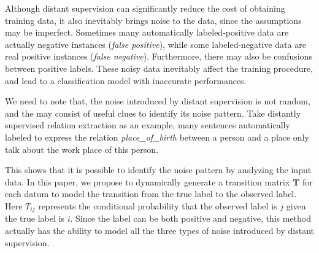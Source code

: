 
Although distant supervision can significantly reduce the cost of obtaining training data, it also inevitably brings noise to the data, since the assumptions may be imperfect.   Sometimes many automatically labeled-positive data are actually negative instances (\emph{false positive}), while some labeled-negative data are real positive instances (\emph{false negative}). Furthermore, there may also be confusions between positive labels. These noisy data inevitably affect the training procedure, and lead to a classification model with inaccurate performances.

We need to note that, the noise introduced by distant supervision is not random, and the  may consist of useful clues to identify its noise pattern. Take distantly supervised relation extraction as an example, many sentences automatically labeled to express the relation \emph{place\_of\_birth} between a person and a place only talk about the work place of this person.  

This shows that it is possible to identify the noise pattern by analyzing the input data. In this paper, we propose to dynamically generate a transition matrix $\mathbf{T}$ for each datum to model the transition from the true label to the observed label. Here $T_{ij}$ represents the conditional probability that the observed label is $j$ given the true label is $i$. Since the label  can be both positive and negative, this method actually has the ability to model all the three types of noise introduced by distant supervision.

